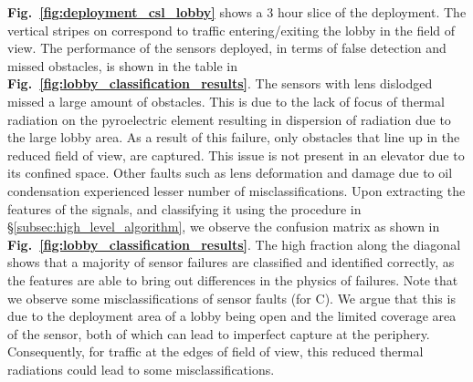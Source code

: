 \textbf{Fig.~\ref{fig:deployment_csl_lobby}} shows a 3 hour slice of the deployment. %
%
The vertical stripes on \cout correspond to traffic entering/exiting the lobby in the field of view. 
The performance of the sensors deployed, in terms of false detection and missed obstacles, is shown in the table in {\bfseries Fig.~\ref{fig:lobby_classification_results}}. The sensors with lens dislodged missed a large amount of obstacles. This is due to the lack of focus of thermal radiation on the pyroelectric element resulting in dispersion of radiation due to the large lobby area. As a result of this failure, only obstacles that line up in the reduced field of view, are captured. This issue is not present in an elevator due to its confined space.
%
Other faults such as lens deformation and damage due to oil condensation experienced lesser number of misclassifications. 
Upon extracting the features of the \aout signals, and classifying it using the procedure in \S\ref{subsec:high_level_algorithm}, %
we observe the confusion matrix as shown in {\bfseries Fig.~\ref{fig:lobby_classification_results}}. The high fraction along the diagonal shows that a majority of sensor failures are classified and identified correctly, as the features are able to bring out differences in the physics of failures.
Note that we observe some misclassifications of sensor faults (\eg for C). We argue that this is due to the deployment area of a lobby being open and the limited coverage area of the sensor, both of which can lead to imperfect capture at the periphery. Consequently, for traffic at the edges of field of view, this reduced thermal radiations could lead to some misclassifications. %




